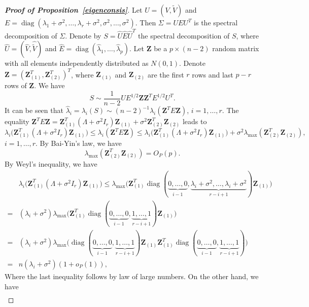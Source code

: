 \documentclass[review]{elsarticle}
\DeclareMathOperator{\mydiag}{diag}
\newcommand{\bZ}{\mathbf{Z}}
\theoremstyle{plain}
\theoremstyle{definition}
\theoremstyle{remark}
\begin{document}
\begin{proof}[\textbf{Proof of Proposition~\ref{eigenconsis}}]
    Let $U=(V,\tilde{V})$ and $E=\mydiag(\lambda_1+\sigma^2,\ldots,\lambda_r+\sigma^2,\sigma^2,\ldots,\sigma^2)$. Then $\Sigma=UEU^T$ is the spectral decomposition of $\Sigma$.
Denote by $S=\hat{U}\hat{E}\hat{U}^T$ the spectral decomposition of $S$, where $\hat{U}=(\hat{V},\hat{\tilde{V}})$ and $\hat{E}=\mydiag(\hat{\lambda}_1,\ldots,\hat{\lambda}_p)$.
Let $\bZ$ be a $p\times (n-2)$ random matrix with all elements independently distributed as $N(0,1)$.
Denote $\bZ={(\bZ_{(1)}^T,\bZ_{(2)}^T)}^T$, where $\bZ_{(1)}$ and $\bZ_{(2)}$ are the first $r$ rows and last $p-r$ rows of $\bZ$. 
We have
$$
S\sim \frac{1}{n-2} U E^{1/2} \bZ \bZ^T E^{1/2} U^T.
$$
It can be seen that $\hat{\lambda}_i=\lambda_i(S)\sim (n-2)^{-1}\lambda_i(\bZ^T E \bZ)$, $i=1,\ldots,r$.
The  equality
$
    \bZ^T E \bZ= \bZ_{(1)}^T (\Lambda +\sigma^2 I_r) \bZ_{(1)}+
\sigma^2 \bZ_{(2)}^T  \bZ_{(2)}
$
leads to
    \begin{equation}\label{aiai1}
    \lambda_i \big(\bZ_{(1)}^T(\Lambda+\sigma^2 I_r)\bZ_{(1)}\big)
\leq \lambda_i(\bZ^T E \bZ)
\leq
\lambda_i \big(\bZ_{(1)}^T(\Lambda+\sigma^2 I_r)\bZ_{(1)}\big)
+\sigma^2\lambda_{\max}(\bZ_{(2)}^T \bZ_{(2)}),
    \end{equation}
$i=1,\ldots, r$.
By Bai-Yin's law, we have
\begin{equation}\label{aiai2}
    \lambda_{\max}(\bZ_{(2)}^T \bZ_{(2)})=O_P(p).
\end{equation}
By Weyl's inequality, we have
$$
    \begin{aligned}
        &\lambda_i\big(\bZ_{(1)}^T(\Lambda+\sigma^2 I_r)\bZ_{(1)}\big)
        \leq
    \lambda_{\max}\big(\bZ_{(1)}^T \mydiag(\underbrace{0,\ldots,0}_{i-1},\underbrace{\lambda_i +\sigma^2,\ldots,\lambda_i+\sigma^2}_{r-i+1})\bZ_{(1)}\big)\\
        =&
        (\lambda_i+\sigma^2)\lambda_{\max}\big(\bZ_{(1)}^T\mydiag(\underbrace{0,\ldots,0}_{i-1},\underbrace{1,\ldots,1}_{r-i+1})\bZ_{(1)}\big)\\
        =&
        (\lambda_i+\sigma^2)\lambda_{\max}\big( \mydiag(\underbrace{0,\ldots,0}_{i-1},\underbrace{1,\ldots,1}_{r-i+1})\bZ_{(1)}\bZ_{(1)}^T \mydiag(\underbrace{0,\ldots,0}_{i-1},\underbrace{1,\ldots,1}_{r-i+1})\big)\\
        =&n(\lambda_i+\sigma^2)(1+o_P(1)),
    \end{aligned}
    $$
    Where the last inequality follows by law of large numbers.
    On the other hand, we have
$$
    \begin{aligned}

\end{aligned}$$
\end{proof}
\end{document}
